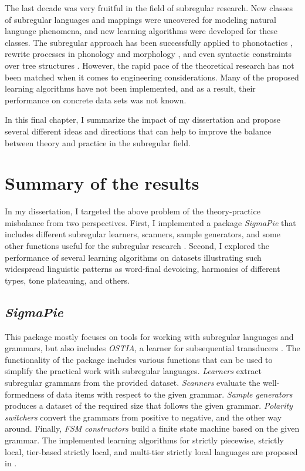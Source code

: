 The last decade was very fruitful in the field of subregular research.
New classes of subregular languages and mappings were uncovered for modeling natural language phenomena, and new learning algorithms were developed for these classes.
The subregular approach has been successfully applied to phonotactics \citep{Heinz10ldp}, rewrite processes in phonology and morphology \citep{Chandlee2014}, and even syntactic constraints over tree structures \citep{Graf18CLS}.
However, the rapid pace of the theoretical research has not been matched when it comes to engineering considerations.
Many of the proposed learning algorithms have not been implemented, and as a result, their performance on concrete data sets was not known.

In this final chapter, I summarize the impact of my dissertation and propose several different ideas and directions that can help to improve the balance between theory and practice in the subregular field.



\section{Summary of the results}

In my dissertation, I targeted the above problem of the theory-practice misbalance from two perspectives.
First, I implemented a package \emph{SigmaPie} \href{https://pypi.org/project/SigmaPie/}{\faCube} that includes different subregular learners, scanners, sample generators, and some other functions useful for the subregular research \citep{sigmapie}.
Second, I explored the performance of several learning algorithms on datasets illustrating such widespread linguistic patterns as word-final devoicing, harmonies of different types, tone plateauing, and others.

\subsection{\emph{SigmaPie} \href{https://pypi.org/project/SigmaPie/}{\faCube}}

This package mostly focuses on tools for working with subregular languages and grammars, but also includes \emph{OSTIA}, a learner for subsequential transducers \citep{OncinaEtAl1993,DeLaHiguera2010}.
The functionality of the package includes various functions that can be used to simplify the practical work with subregular languages.
\emph{Learners} extract subregular grammars from the provided dataset.
\emph{Scanners} evaluate the well-formedness of data items with respect to the given grammar.
\emph{Sample generators} produces a dataset of the required size that follows the given grammar.
\emph{Polarity switchers} convert the grammars from positive to negative, and the other way around.
Finally, \emph{FSM constructors} build a finite state machine based on the given grammar.
The implemented learning algorithms for strictly piecewise, strictly local, tier-based strictly local, and multi-tier strictly local languages are proposed in \citep{Heinz-2010-SEL,JardineMcMullin2017,McMullinAksenovaDeSanto2019}.


